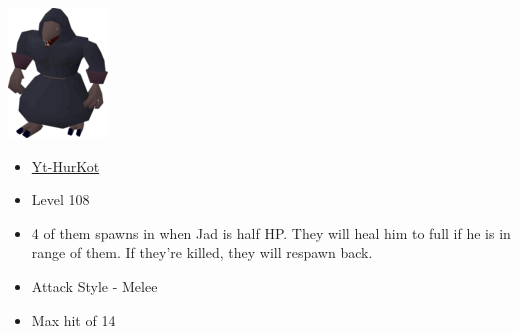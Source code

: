 \documentclass{article}
\begin{document}
\begin{multicols}{2}
  \null \vfill
  \includegraphics[width=.3\textwidth]{yt2.png}
  \vfill \null
\columnbreak
  \null \vfill
  \begin{itemize}
    \item \underline{Yt-HurKot}
    \item Level 108
    \item 4 of them spawns in when Jad is half HP. They will heal him to full if he is in range of them. If they're killed, they will respawn back. 
    \item Attack Style - Melee
    \item Max hit of 14
  \end{itemize}
  \vfill \null
\end{multicols}
\newpage
\end{document}
